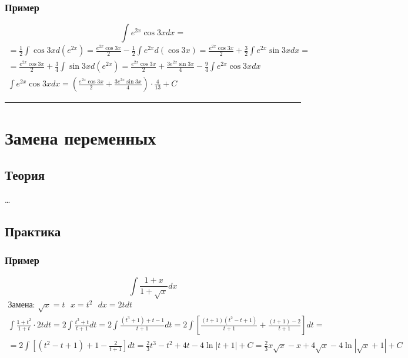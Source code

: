 \documentclass{article}
\begin{document}
\subsubsection{Пример}
\[
    \int e^{2x} \cos 3x dx = 
\]
\begin{gather*}
    = \frac{1}{2} \int \cos 3x d(e^{2x}) =
      \frac{e^{2x} \cos 3x}{2} - \frac{1}{2} \int e^{2x} d(\cos 3x) =
      \frac{e^{2x} \cos 3x}{2} + \frac{3}{2} \int e^{2x} \sin 3x dx =                           \\
    = \frac{e^{2x} \cos 3x}{2} + \frac{3}{4} \int \sin 3x d(e^{2x}) =
      \frac{e^{2x} \cos 3x}{2} + \frac{3e^{2x} \sin 3x}{4} - \frac{9}{4} \int e^{2x} \cos 3x dx \\
      \int e^{2x} \cos 3x dx = \left(\frac{e^{2x} \cos 3x}{2} + \frac{3e^{2x} \sin 3x}{4}\right) \cdot \frac{4}{13} + C
\end{gather*}



\par\noindent\rule{\textwidth}{1pt}
\section{Замена переменных}

\subsection{Теория}
\dots


\subsection{Практика}

\subsubsection{Пример}
\[
    \int \frac{1 + x}{1 + \sqrt{x}} dx
\]
\begin{gather*}
    \text{Замена: } \sqrt{x} = t ~~~ x = t^2 ~~~ dx = 2tdt                                   \\
      \int \frac{1 + t^2}{1 + t} \cdot 2tdt =
      2\int \frac{t^3 + t}{t + 1} dt =
      2\int \frac{(t^3 + 1) + t - 1}{t + 1} dt =
      2\int \left[\frac{(t + 1)(t^2 - t + 1)}{t + 1} + \frac{(t + 1) - 2}{t + 1}\right] dt = \\
    = 2\int \left[(t^2 - t + 1) + 1 - \frac{2}{t + 1}\right] dt =
      \frac{2}{3} t^3 - t^2 + 4t - 4\ln |t + 1| + C =
      \frac{2}{3} x\sqrt{x} - x + 4\sqrt{x} - 4\ln |\sqrt{x} + 1 | + C
\end{gather*}
\end{document}
